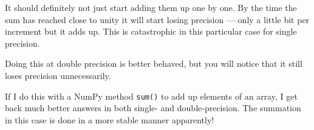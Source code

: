   
\begin{answer}
It should definitely not just start adding them up one by one. By the
time the sum has reached close to unity it will start losing precision
--- only a little bit per increment but it adds up. This is
catastrophic in this particular case for single precision.

Doing this at double precision is better behaved, but you will notice
that it still loses precision unnecessarily.

If I do this with a NumPy method {\tt sum()} to add up elements of an
array, I get back much better answers in both single- and
double-precision. The summation in this case is done in a more stable
manner apparently!
\end{answer}

